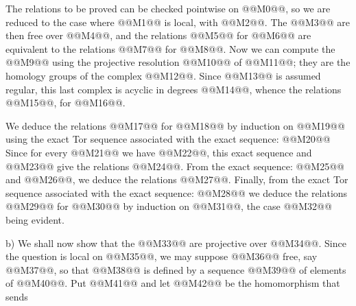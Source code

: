 The relations to be proved can be checked pointwise on @@M0@@, so we are reduced to the case where @@M1@@ is local, with @@M2@@. The @@M3@@ are then free over @@M4@@, and the relations @@M5@@ for @@M6@@ are equivalent to the relations @@M7@@ for @@M8@@. Now we can compute the @@M9@@ using the projective resolution @@M10@@ of @@M11@@; they are the homology groups of the complex @@M12@@. Since @@M13@@ is assumed regular, this last complex is acyclic in degrees @@M14@@, whence the relations @@M15@@, for @@M16@@.

We deduce the relations @@M17@@ for @@M18@@ by induction on @@M19@@ using the exact Tor sequence associated with the exact sequence:
@@M20@@
Since for every @@M21@@ we have @@M22@@, this exact sequence and @@M23@@ give the relations @@M24@@. From the exact sequence:
@@M25@@
and @@M26@@, we deduce the relations @@M27@@. Finally, from the exact Tor sequence associated with the exact sequence:
@@M28@@
we deduce the relations @@M29@@ for @@M30@@ by induction on @@M31@@, the case @@M32@@ being evident.

b) We shall now show that the @@M33@@ are projective over @@M34@@. Since the question is local on @@M35@@, we may suppose @@M36@@ free, say @@M37@@, so that @@M38@@ is defined by a sequence @@M39@@ of elements of @@M40@@. Put @@M41@@ and let @@M42@@ be the homomorphism that sends
